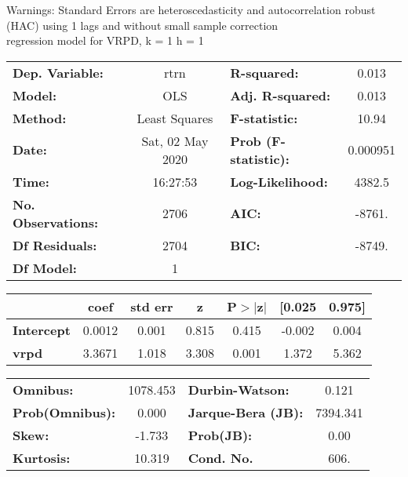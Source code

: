 Warnings: \newline
 [1] Standard Errors are heteroscedasticity and autocorrelation robust (HAC) using 1 lags and without small sample correction\\ 

regression model for VRPD, k = 1 h = 1\begin{center}
\begin{tabular}{lclc}
\toprule
\textbf{Dep. Variable:}    &       rtrn       & \textbf{  R-squared:         } &     0.013   \\
\textbf{Model:}            &       OLS        & \textbf{  Adj. R-squared:    } &     0.013   \\
\textbf{Method:}           &  Least Squares   & \textbf{  F-statistic:       } &     10.94   \\
\textbf{Date:}             & Sat, 02 May 2020 & \textbf{  Prob (F-statistic):} &  0.000951   \\
\textbf{Time:}             &     16:27:53     & \textbf{  Log-Likelihood:    } &    4382.5   \\
\textbf{No. Observations:} &        2706      & \textbf{  AIC:               } &    -8761.   \\
\textbf{Df Residuals:}     &        2704      & \textbf{  BIC:               } &    -8749.   \\
\textbf{Df Model:}         &           1      & \textbf{                     } &             \\
\bottomrule
\end{tabular}
\begin{tabular}{lcccccc}
                   & \textbf{coef} & \textbf{std err} & \textbf{z} & \textbf{P$> |$z$|$} & \textbf{[0.025} & \textbf{0.975]}  \\
\midrule
\textbf{Intercept} &       0.0012  &        0.001     &     0.815  &         0.415        &       -0.002    &        0.004     \\
\textbf{vrpd}      &       3.3671  &        1.018     &     3.308  &         0.001        &        1.372    &        5.362     \\
\bottomrule
\end{tabular}
\begin{tabular}{lclc}
\textbf{Omnibus:}       & 1078.453 & \textbf{  Durbin-Watson:     } &    0.121  \\
\textbf{Prob(Omnibus):} &   0.000  & \textbf{  Jarque-Bera (JB):  } & 7394.341  \\
\textbf{Skew:}          &  -1.733  & \textbf{  Prob(JB):          } &     0.00  \\
\textbf{Kurtosis:}      &  10.319  & \textbf{  Cond. No.          } &     606.  \\
\bottomrule
\end{tabular}
\end{center}

